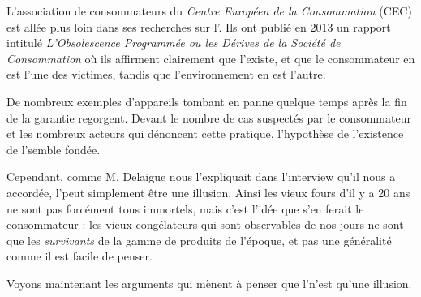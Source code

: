 L'association de consommateurs du \textit{Centre Européen de la Consommation} (CEC) est allée plus loin dans ses recherches sur l'\op. Ils ont publié en 2013 un rapport intitulé \textit{L'Obsolescence Programmée ou les Dérives de la Société de Consommation} où ils affirment clairement que l'\op existe, et que le consommateur en est l'une des victimes, tandis que l'environnement en est l'autre. 

\medbreak

De nombreux exemples d'appareils tombant en panne quelque temps après la fin de la garantie regorgent. Devant le nombre de cas suspectés par le consommateur et les nombreux acteurs qui dénoncent cette pratique, l'hypothèse de l'existence de l'\op semble fondée. 

\bigbreak
Cependant, comme M. Delaigue nous l'expliquait dans l'interview qu'il nous a accordée, l'\op peut simplement être une illusion. Ainsi les vieux fours d'il y a 20 ans ne sont pas forcément tous immortels, mais c'est l'idée que s'en ferait le consommateur : les vieux congélateurs qui sont observables de nos jours ne sont que les \textit{survivants} de la gamme de produits de l'époque, et pas une généralité comme il est facile de penser. 


Voyons maintenant les arguments qui mènent à penser que l'\op n'est qu'une illusion. 
